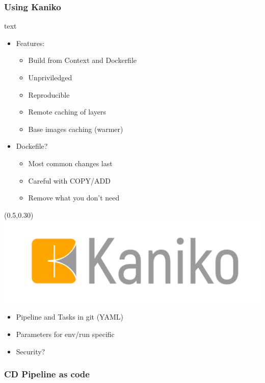 \documentclass[aspectratio=169,11pt,hyperref={colorlinks=true}]{beamer}
\begin{document}
\begin{lblackrwhiteframe}
\begin{lblackrwhiteframe}
\begin{blackframe}
\begin{lblackrwhiteframe}
  \frametitle{Using Kaniko}
  \large
  \begin{beamercolorbox}[wd=0.45\paperwidth]{text}
    \begin{itemize}
      \item Features:
      \begin{itemize}
        \item Build from Context and Dockerfile
        \item Unpriviledged
        \item Reproducible
        \item Remote caching of layers
        \item Base images caching (warmer)
      \end{itemize}
    \end{itemize}
    \vspace{3ex}
    \begin{itemize}
      \item Dockefile?
      \begin{itemize}
        \item Most common changes last
        \item Careful with COPY/ADD
        \item Remove what you don't need
      \end{itemize}
    \end{itemize}
  \end{beamercolorbox}%
  \begin{textblock*}{0.5\paperwidth}(0.5\paperwidth,0.30\paperheight)
    \centering
    \includegraphics[width=0.35\paperwidth]{img/Kaniko-Logo.png}
  \end{textblock*}
\end{lblackrwhiteframe}

\begin{2columnsframe}
  {
  \begin{itemize}
    \item Pipeline and Tasks in git (YAML)
    \item Parameters for env/run specific
    \item Security?
  \end{itemize}
  \vspace{3ex}
  
  }
  {
  
  \vspace{1ex}
  
  }
  \frametitle{CD Pipeline as code}
\end{2columnsframe}


\end{blackframe}
\end{lblackrwhiteframe}
\end{lblackrwhiteframe}
\end{document}

